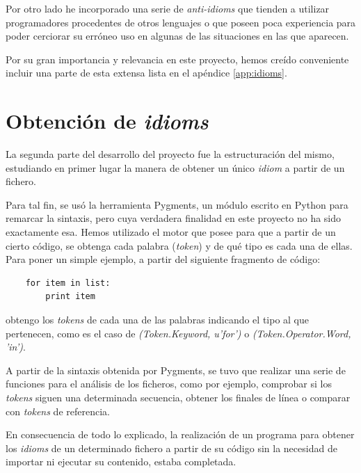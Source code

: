 \documentclass[a4paper, 12pt]{book}
\begin{document}
Por otro lado he incorporado una serie de \textit{anti-idioms} que tienden a utilizar programadores procedentes de otros lenguajes o que poseen poca experiencia para poder cerciorar su erróneo uso en algunas de las situaciones en las que aparecen.

Por su gran importancia y relevancia en este proyecto, hemos creído conveniente incluir una parte de esta extensa lista en el apéndice \ref{app:idioms}.
\section{Obtención de \textit{idioms}}
\label{sec:obtencion_idioms}

La segunda parte del desarrollo del proyecto fue la estructuración del mismo, estudiando en primer lugar la manera de obtener un único \textit{idiom} a partir de un fichero.

Para tal fin, se usó la herramienta Pygments, un módulo escrito en Python para remarcar la sintaxis, pero cuya verdadera finalidad en este proyecto no ha sido exactamente esa. Hemos utilizado el motor que posee para que a partir de un cierto código, se obtenga cada palabra (\textit{token}) y de qué tipo es cada una de ellas. Para poner un simple ejemplo, a partir del siguiente fragmento de código:

\begin{verbatim}
    for item in list:
        print item
\end{verbatim}

obtengo los \textit{tokens} de cada una de las palabras indicando el tipo al que pertenecen, como es el caso de \textit{(Token.Keyword, u'for')} o \textit{(Token.Operator.Word, 'in')}.

A partir de la sintaxis obtenida por Pygments, se tuvo que realizar una serie de funciones para el análisis de los ficheros, como por ejemplo, comprobar si los \textit{tokens} siguen una determinada secuencia, obtener los finales de línea o comparar con \textit{tokens} de referencia.

En consecuencia de todo lo explicado, la realización de un programa para obtener los \textit{idioms} de un determinado fichero a partir de su código sin la necesidad de importar ni ejecutar su contenido, estaba completada.
\end{document}
